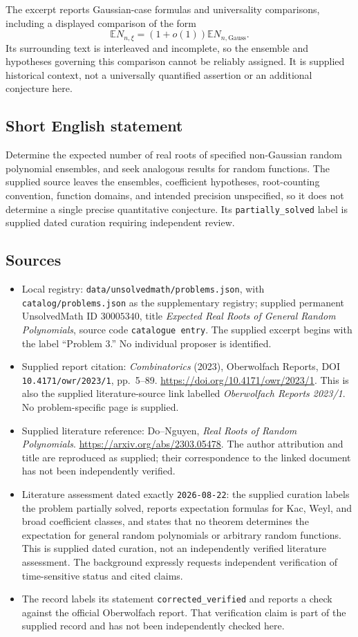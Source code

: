 \documentclass[11pt]{article}
\newcommand{\E}{\mathbb{E}}
\begin{document}
The excerpt reports Gaussian-case formulas and universality comparisons, including a displayed comparison of the form
\[
\E N_{n,\xi}=(1+o(1))\E N_{n,\mathrm{Gauss}}.
\]
Its surrounding text is interleaved and incomplete, so the ensemble and hypotheses governing this comparison cannot be reliably assigned. It is supplied historical context, not a universally quantified assertion or an additional conjecture here.
\subsection{Short English statement}
Determine the expected number of real roots of specified non-Gaussian random polynomial ensembles, and seek analogous results for random functions. The supplied source leaves the ensembles, coefficient hypotheses, root-counting convention, function domains, and intended precision unspecified, so it does not determine a single precise quantitative conjecture. Its \texttt{partially\_solved} label is supplied dated curation requiring independent review.
\subsection{Sources}
\begin{itemize}
\item Local registry: \texttt{data/unsolvedmath/problems.json}, with \texttt{catalog/problems.json} as the supplementary registry; supplied permanent UnsolvedMath ID \(30005340\), title \emph{Expected Real Roots of General Random Polynomials}, source code \texttt{catalogue entry}. The supplied excerpt begins with the label ``Problem 3.'' No individual proposer is identified.
\item Supplied report citation: \emph{Combinatorics} (2023), Oberwolfach Reports, DOI \texttt{10.4171/owr/2023/1}, pp.~5--89. \url{https://doi.org/10.4171/owr/2023/1}. This is also the supplied literature-source link labelled \emph{Oberwolfach Reports 2023/1}. No problem-specific page is supplied.
\item Supplied literature reference: Do--Nguyen, \emph{Real Roots of Random Polynomials}. \url{https://arxiv.org/abs/2303.05478}. The author attribution and title are reproduced as supplied; their correspondence to the linked document has not been independently verified.
\item Literature assessment dated exactly \texttt{2026-08-22}: the supplied curation labels the problem partially solved, reports expectation formulas for Kac, Weyl, and broad coefficient classes, and states that no theorem determines the expectation for general random polynomials or arbitrary random functions. This is supplied dated curation, not an independently verified literature assessment. The background expressly requests independent verification of time-sensitive status and cited claims.
\item The record labels its statement \texttt{corrected\_verified} and reports a check against the official Oberwolfach report. That verification claim is part of the supplied record and has not been independently checked here.
\end{itemize}
\end{document}
